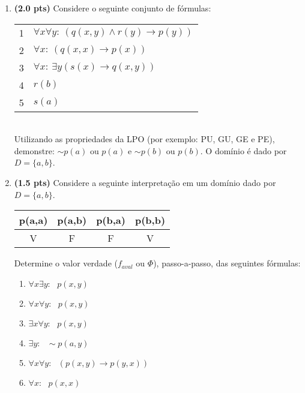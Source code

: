 \documentclass[11pt, a4paper,final]{article}
\begin{document}
\begin{enumerate}
\begin{comment}

\item {\bf (1.0 pt)} Utilizando o método de  {\em demonstração por condicional}  a validade do   argumento $ p \rightarrow u $, a partir das premissas:
$$ \{ p \vee q \rightarrow r,~ s \rightarrow \sim r \wedge \sim t,~ s \vee u \} ~\vdash~ p \rightarrow u $$
\end{comment}  


\item {\bf (2.0 pts)} Considere o seguinte conjunto de fórmulas: 

\begin{tabular}{ll}
1 &  $\forall x\forall y:~ (q(x,y) \wedge r(y) \rightarrow p(y)) $ \\
2 &  $\forall x:~  (q(x,x) \rightarrow p(x))  $ \\
3 &  $\forall x:~ \exists y ( s(x) \rightarrow q(x,y)) $ \\
4 &  $r(b)$ \\ 
5 &  $s(a)$ \\
\end{tabular}\\
Utilizando as propriedades da LPO (por exemplo: PU, GU, GE e PE), 
demonstre: $\sim p(a)$ ou $p(a)$ e $\sim p(b)$ ou $p(b)$.
O domínio é dado por $D=\{a,b\}$. 


\item {\bf (1.5 pts)} Considere a seguinte interpretação em um domínio dado por $D=\{a,b\}$. 

\begin{tabular}{c |c | c | c } \hline \hline 
p(a,a) & p(a,b)  & p(b,a) & p(b,b)  \\  \hline 
 V & F & F & V \\ \hline \hline 
\end{tabular}

Determine o valor verdade ($f_{aval}$  ou $\Phi $), passo-a-passo, das seguintes fórmulas:

\begin{enumerate}
\itemsep -2pt
\item $\forall x \exists y:~ \:\: p(x,y) $
\item $\forall x \forall y:~ \:\: p(x,y) $
\item $\exists x \forall y:~ \:\: p(x,y) $
\item $\exists y:~ \:\: \sim p(a,y) $
\item $\forall x \forall y:~ \:\: (p(x,y) \rightarrow p(y,x)) $
\item $\forall x:~  \:\: p(x,x) $
\end{enumerate}


\end{enumerate}
\end{document}
